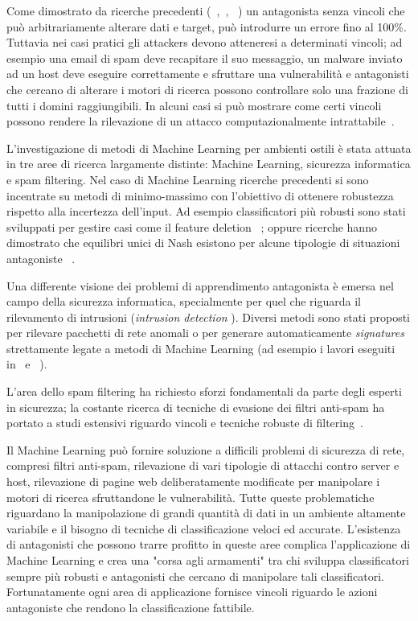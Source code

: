 Come dimostrato da ricerche precedenti (~\cite{kearnsli},~\cite{Auer2002},~\cite{paclearning} ) un antagonista senza vincoli che può arbitrariamente alterare dati e target, può introdurre un errore fino al 100\%. Tuttavia nei casi pratici gli attackers devono atteneresi a determinati vincoli; ad esempio una email di spam deve recapitare il suo messaggio, un malware inviato ad un host deve eseguire correttamente e sfruttare una vulnerabilità e antagonisti che cercano di alterare i motori di ricerca possono controllare solo una frazione di tutti i domini raggiungibili. In alcuni casi si può mostrare come certi vincoli possono rendere la rilevazione di un attacco computazionalmente intrattabile~\cite{fogla}.

L'investigazione di metodi di Machine Learning per ambienti ostili è stata attuata in tre aree di ricerca largamente distinte: Machine Learning, sicurezza informatica e spam filtering. Nel caso di Machine Learning ricerche precedenti si sono incentrate su metodi di minimo-massimo con l'obiettivo di ottenere robustezza rispetto alla incertezza dell'input. Ad esempio classificatori più robusti sono stati sviluppati per gestire casi come il feature deletion~\cite{globerson} ; oppure ricerche hanno dimostrato che equilibri unici di Nash esistono per alcune tipologie di situazioni antagoniste~\cite{nash} .

Una differente visione dei problemi di apprendimento antagonista è emersa nel campo della sicurezza informatica, specialmente per quel che riguarda il rilevamento di intrusioni (\textit{intrusion detection} ). Diversi metodi sono stati proposti per rilevare pacchetti di rete anomali o per generare automaticamente \textit{signatures} strettamente legate a metodi di Machine Learning (ad esempio i lavori eseguiti in~\cite{wangstolfo} e~\cite{wang2006} ).

L'area dello spam filtering ha richiesto sforzi fondamentali da parte degli esperti in sicurezza; la costante ricerca di tecniche di evasione dei filtri anti-spam ha portato a studi estensivi riguardo vincoli e tecniche robuste di filtering~\cite{dalvi}. 

Il Machine Learning può fornire soluzione a difficili problemi di sicurezza di rete, compresi filtri anti-spam, rilevazione di vari tipologie di attacchi contro server e host, rilevazione di pagine web deliberatamente modificate per manipolare i motori di ricerca sfruttandone le vulnerabilità. Tutte queste problematiche riguardano la manipolazione di grandi quantità di dati in un ambiente altamente variabile e il bisogno di tecniche di classificazione veloci ed accurate. L'esistenza di antagonisti che possono trarre profitto in queste aree complica l'applicazione di Machine Learning e crea una "corsa agli armamenti" tra chi sviluppa classificatori sempre più robusti e antagonisti che cercano di manipolare tali classificatori. Fortunatamente ogni area di applicazione fornisce vincoli riguardo le azioni antagoniste che rendono la classificazione fattibile. 

